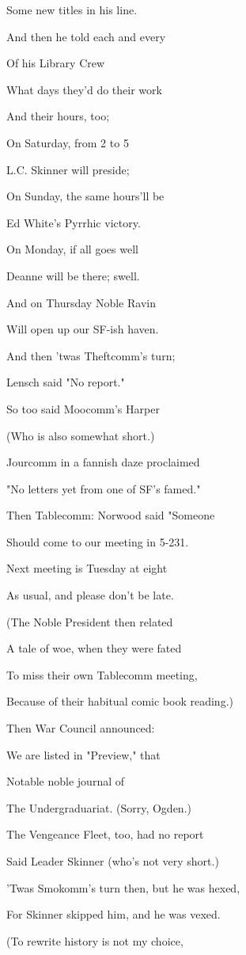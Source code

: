 \documentclass[12pt]{article}
\begin{document}
Some new titles in his line.

And then he told each and every

Of his Library Crew

What days they'd do their work

And their hours, too;

On Saturday, from 2 to 5

L.C. Skinner will preside;

On Sunday, the same hours'll be

Ed White's Pyrrhic victory.

On Monday, if all goes well

Deanne will be there; swell.

And on Thursday Noble Ravin

Will open up our SF-ish haven.

And then 'twas Theftcomm's turn;

Lensch said "No report."

So too said Moocomm's Harper

(Who is also somewhat short.)

Jourcomm in a fannish daze proclaimed

"No letters yet from one of SF's famed."

Then Tablecomm: Norwood said "Someone

Should come to our meeting in 5-231.

Next meeting is Tuesday at eight

As usual, and please don't be late.

(The Noble President then related

A tale of woe, when they were fated

To miss their own Tablecomm meeting,

Because of their habitual comic book reading.)

Then War Council announced:

We are listed in "Preview," that

Notable noble journal of

The Undergraduariat. (Sorry, Ogden.)

The Vengeance Fleet, too, had no report

Said Leader Skinner (who's not very short.)

'Twas Smokomm's turn then, but he was hexed,

For Skinner skipped him, and he was vexed.

(To rewrite history is not my choice,
\end{document}
